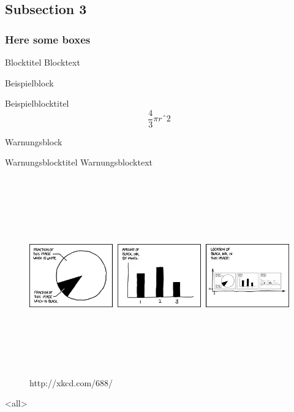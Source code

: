 \documentclass{beamer}
\begin{document}
\subsection{Subsection 3}
\begin{frame}
\frametitle{Here some boxes}
\begin{block}{Blocktitel}
        Blocktext
\end{block}

Beispielblock

\begin{exampleblock}{Beispielblocktitel}
        \begin{equation} \frac{4}{3}\pi rˆ2 \end{equation}
\end{exampleblock}


Warnungsblock

\begin{alertblock}{Warnungsblocktitel}
        Warnungsblocktext
\end{alertblock}
\end{frame}



\begin{frame}[plain]
\begin{figure}
\includegraphics[height=8.5cm]{self_description.png}
\caption{http://xkcd.com/688/}
\end{figure}
\end{frame}





 
\newcommand{\LastPageText}{Your text goes right here!}
\begin{frame}[plain]
\lastpage
\end{frame}



\mode
<all>
\end{document}
